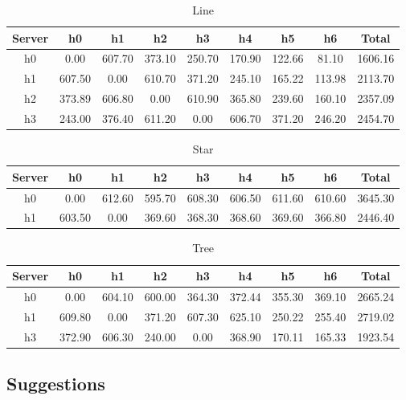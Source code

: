 \begin{table}
	\renewcommand{\arraystretch}{1.3}
	\caption{Line}
	\label{table:line}
	\centering
	\begin{tabular}{|c|c|c|c|c|c|c|c|c|}
		\hline
		Server & h0 & h1 & h2 & h3 & h4 & h5 & h6 & Total\\
\hline
h0 &  0.00  &  607.70  &  373.10  &  250.70  &  170.90  &  122.66  &  81.10  & 1606.16 \\
\hline
h1 &  607.50  &  0.00  &  610.70  &  371.20  &  245.10  &  165.22  &  113.98  & 2113.70 \\
\hline
h2 &  373.89  &  606.80  &  0.00  &  610.90  &  365.80  &  239.60  &  160.10  & 2357.09 \\
\hline
h3 &  243.00  &  376.40  &  611.20  &  0.00  &  606.70  &  371.20  &  246.20  & 2454.70 \\
\hline
	\end{tabular}
\end{table}

\begin{table}
	\renewcommand{\arraystretch}{1.3}
	\caption{Star}
	\label{table:star}
	\centering
	\begin{tabular}{|c|c|c|c|c|c|c|c|c|}
		\hline
		Server & h0 & h1 & h2 & h3 & h4 & h5 & h6 & Total\\
\hline
h0 &  0.00  &  612.60  &  595.70  &  608.30  &  606.50  &  611.60  &  610.60  & 3645.30 \\
\hline
h1 &  603.50  &  0.00  &  369.60  &  368.30  &  368.60  &  369.60  &  366.80  & 2446.40 \\
\hline
	\end{tabular}
\end{table}

\begin{table}
	\renewcommand{\arraystretch}{1.3}
	\caption{Tree}
	\label{table:tree}
	\centering
	\begin{tabular}{|c|c|c|c|c|c|c|c|c|}
		\hline
		Server & h0 & h1 & h2 & h3 & h4 & h5 & h6 & Total\\
\hline
h0 &  0.00  &  604.10  &  600.00  &  364.30  &  372.44  &  355.30  &  369.10  & 2665.24 \\
\hline
h1 &  609.80  &  0.00  &  371.20  &  607.30  &  625.10  &  250.22  &  255.40  & 2719.02 \\
\hline
h3 &  372.90  &  606.30  &  240.00  &  0.00  &  368.90  &  170.11  &  165.33  & 1923.54 \\
\hline
	\end{tabular}
\end{table}


\subsection{Suggestions} \label{subsec:suggestions}

